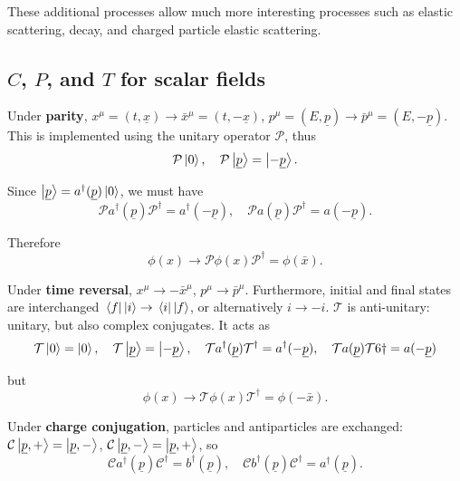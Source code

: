 \documentclass{article}
\numberwithin{equation}{section}
\begin{document}
These additional processes allow much more interesting processes such as elastic scattering, decay, and charged particle elastic scattering. 

\subsection{$C$, $P$, and $T$ for scalar fields}

Under \textbf{parity}, $x^\mu=(t,\underline{x}) \rightarrow \bar{x}^\mu = (t, -\underline{x})$, $p^\mu = (E, \underline{p}) \rightarrow \bar{p}^\mu = (E, -\underline{p})$. This is implemented using the unitary operator $\mathcal{P}$, thus
\begin{equation}
    \mathcal{P} \ket{0}, \quad \mathcal{P} \ket{\underline{p}} = \ket{-\underline{p}}.
\end{equation}

Since $\ket{\underline{p}} = a^\dagger(\underline{p})\ket{0}$, we must have
\begin{equation}\label{eq:parity_scalar}
    \mathcal{P}a^\dagger(\underline{p})\mathcal{P}^\dagger = a^\dagger(-\underline{p}), \quad \mathcal{P}a(\underline{p})\mathcal{P}^\dagger = a(-\underline{p}).
\end{equation}

Therefore
\begin{equation}
    \phi(x) \rightarrow \mathcal{P} \phi(x) \mathcal{P}^\dagger = \phi(\bar{x}).
\end{equation}

Under \textbf{time reversal}, $x^\mu \rightarrow -\bar{x}^\mu$, $p^\mu \rightarrow \bar{p}^\mu$. Furthermore, initial and final states are interchanged $\mel{f}{\,}{i} \rightarrow \mel{i}{\,}{f}$, or alternatively $i \rightarrow -i$. $\mathcal{T}$ is anti-unitary: unitary, but also complex conjugates. It acts as 
\begin{equation}
    \mathcal{T}\ket{0} = \ket{0}, \quad \mathcal{T}\ket{\underline{p}} = \ket{-\underline{p}}, \quad \mathcal{T} a^\dagger(\underline{p})\mathcal{T}^\dagger = a^\dagger(-\underline{p}), \quad \mathcal{T}a(\underline{p})\mathcal{T}6 \dagger = a(-\underline{p})
\end{equation}

but
\begin{equation}
    \phi(x) \rightarrow \mathcal{T} \phi(x) \mathcal{T}^\dagger = \phi(-\bar{x}).
\end{equation}

Under \textbf{charge conjugation}, particles and antiparticles are exchanged: $\mathcal{C}\ket{\underline{p},+} = \ket{\underline{p},-}$, $\mathcal{C}\ket{\underline{p},-} = \ket{\underline{p},+}$, so 
\begin{equation}
    \mathcal{C}a^\dagger(\underline{p})\mathcal{C}^\dagger = b^\dagger(\underline{p}), \quad \mathcal{C}b^\dagger(\underline{p})\mathcal{C}^\dagger = a^\dagger(\underline{p}).
\end{equation}
\end{document}
